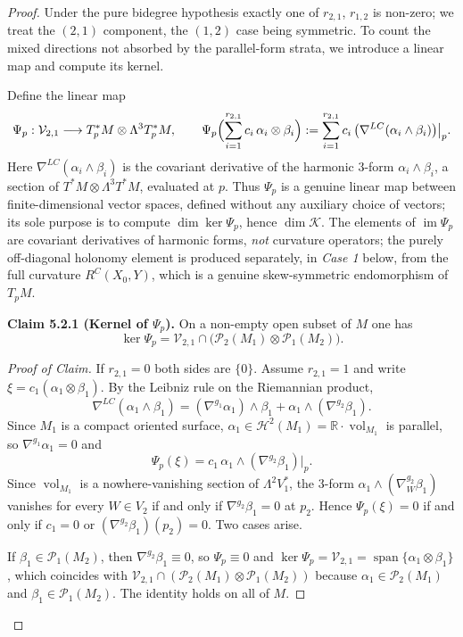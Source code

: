 \documentclass[11pt,reqno]{amsart}
\theoremstyle{plain}
\theoremstyle{definition}
\numberwithin{equation}{section}
\begin{document}
\begin{proof}
Under the pure bidegree hypothesis exactly one of $r_{2,1}$, $r_{1,2}$ is non-zero; we treat the $(2,1)$ component, the $(1,2)$ case being symmetric. To count the mixed directions not absorbed by the parallel-form strata, we introduce a linear map and compute its kernel.

Define the linear map
\begin{equation}\label{eq:defPsi}
\Psi_p:\mathcal{V}_{2,1}\longrightarrow T_p^*M\otimes\Lambda^3 T_p^*M,\qquad
\Psi_p\Bigl(\sum_{i=1}^{r_{2,1}} c_i\,\alpha_i\otimes\beta_i\Bigr):=
\sum_{i=1}^{r_{2,1}} c_i\,\bigl(\nabla^{LC}(\alpha_i\wedge\beta_i)\bigr)\big|_p .
\end{equation}
Here $\nabla^{LC}(\alpha_i\wedge\beta_i)$ is the covariant derivative of the harmonic $3$-form $\alpha_i\wedge\beta_i$, a section of $T^*M\otimes\Lambda^3 T^*M$, evaluated at $p$. Thus $\Psi_p$ is a genuine linear map between finite-dimensional
vector spaces, defined without any auxiliary choice of vectors; its sole purpose is to compute $\dim\ker\Psi_p$, hence $\dim\mathcal{K}$. The elements of
$\operatorname{im}\Psi_p$ are covariant derivatives of harmonic forms, \emph{not} curvature operators; the purely off-diagonal holonomy element is produced separately, in \emph{Case 1} below, from the full curvature $R^C(X_0,Y)$, which is
a genuine skew-symmetric endomorphism of $T_pM$.

\medskip
\noindent\textbf{Claim 5.2.1 (Kernel of $\Psi_p$).}
On a non-empty open subset of $M$ one has
\[
\ker\Psi_p=\mathcal{V}_{2,1}\cap\bigl(\mathcal{P}_2(M_1)\otimes\mathcal{P}_1(M_2)\bigr).
\]

\begin{proof}[Proof of Claim]
If $r_{2,1}=0$ both sides are $\{0\}$. Assume $r_{2,1}=1$ and write
$\xi=c_1(\alpha_1\otimes\beta_1)$. By the Leibniz rule on the Riemannian product,
\[
\nabla^{LC}(\alpha_1\wedge\beta_1)
=(\nabla^{g_1}\alpha_1)\wedge\beta_1+\alpha_1\wedge(\nabla^{g_2}\beta_1).
\]
Since $M_1$ is a compact oriented surface,
$\alpha_1\in\mathcal{H}^2(M_1)=\mathbb{R}\cdot\operatorname{vol}_{M_1}$ is parallel,
so $\nabla^{g_1}\alpha_1=0$ and
\[
\Psi_p(\xi)=c_1\,\alpha_1\wedge(\nabla^{g_2}\beta_1)\big|_{p}.
\]
Since $\operatorname{vol}_{M_1}$ is a nowhere-vanishing section of $\Lambda^2 V_1^*$,
the $3$-form $\alpha_1\wedge(\nabla^{g_2}_W\beta_1)$ vanishes for every $W\in V_2$ if
and only if $\nabla^{g_2}\beta_1=0$ at $p_2$. Hence $\Psi_p(\xi)=0$ if and only if
$c_1=0$ or $(\nabla^{g_2}\beta_1)(p_2)=0$. Two cases arise.

If $\beta_1\in\mathcal{P}_1(M_2)$, then $\nabla^{g_2}\beta_1\equiv 0$, so $\Psi_p\equiv 0$
and $\ker\Psi_p=\mathcal{V}_{2,1}=\operatorname{span}\{\alpha_1\otimes\beta_1\}$,
which coincides with
$\mathcal{V}_{2,1}\cap(\mathcal{P}_2(M_1)\otimes\mathcal{P}_1(M_2))$ because
$\alpha_1\in\mathcal{P}_2(M_1)$ and $\beta_1\in\mathcal{P}_1(M_2)$. The identity holds
on all of $M$.


\end{proof}
\end{proof}
\end{document}
